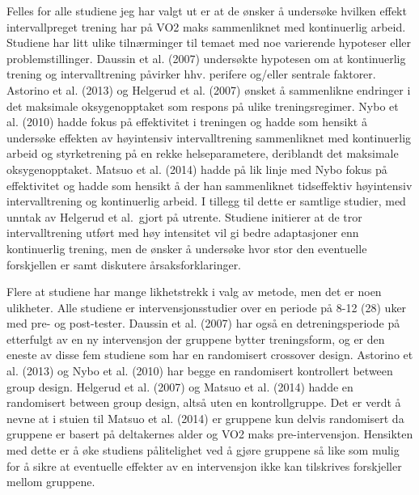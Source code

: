 \documentclass[
  letterpaper,
  DIV=11,
  numbers=noendperiod]{scrartcl}
\begin{document}
Felles for alle studiene jeg har valgt ut er at de ønsker å undersøke
hvilken effekt intervallpreget trening har på VO2 maks sammenliknet med
kontinuerlig arbeid. Studiene har litt ulike tilnærminger til temaet med
noe varierende hypoteser eller problemstillinger. Daussin et al. (2007)
undersøkte hypotesen om at kontinuerlig trening og intervalltrening
påvirker hhv. perifere og/eller sentrale faktorer. Astorino et al.
(2013) og Helgerud et al. (2007) ønsket å sammenlikne endringer i det
maksimale oksygenopptaket som respons på ulike treningsregimer. Nybo et
al. (2010) hadde fokus på effektivitet i treningen og hadde som hensikt
å undersøke effekten av høyintensiv intervalltrening sammenliknet med
kontinuerlig arbeid og styrketrening på en rekke helseparametere,
deriblandt det maksimale oksygenopptaket. Matsuo et al. (2014) hadde på
lik linje med Nybo fokus på effektivitet og hadde som hensikt å der han
sammenliknet tidseffektiv høyintensiv intervalltrening og kontinuerlig
arbeid. I tillegg til dette er samtlige studier, med unntak av Helgerud
et al.~gjort på utrente. Studiene initierer at de tror intervalltrening
utført med høy intensitet vil gi bedre adaptasjoner enn kontinuerlig
trening, men de ønsker å undersøke hvor stor den eventuelle forskjellen
er samt diskutere årsaksforklaringer.

Flere at studiene har mange likhetstrekk i valg av metode, men det er
noen ulikheter. Alle studiene er intervensjonsstudier over en periode på
8-12 (28) uker med pre- og post-tester. Daussin et al. (2007) har også
en detreningsperiode på etterfulgt av en ny intervensjon der gruppene
bytter treningsform, og er den eneste av disse fem studiene som har en
randomisert crossover design. Astorino et al. (2013) og Nybo et al.
(2010) har begge en randomisert kontrollert between group design.
Helgerud et al. (2007) og Matsuo et al. (2014) hadde en randomisert
between group design, altså uten en kontrollgruppe. Det er verdt å nevne
at i stuien til Matsuo et al. (2014) er gruppene kun delvis randomisert
da gruppene er basert på deltakernes alder og VO2 maks pre-intervensjon.
Hensikten med dette er å øke studiens pålitelighet ved å gjøre gruppene
så like som mulig for å sikre at eventuelle effekter av en intervensjon
ikke kan tilskrives forskjeller mellom gruppene.
\end{document}
